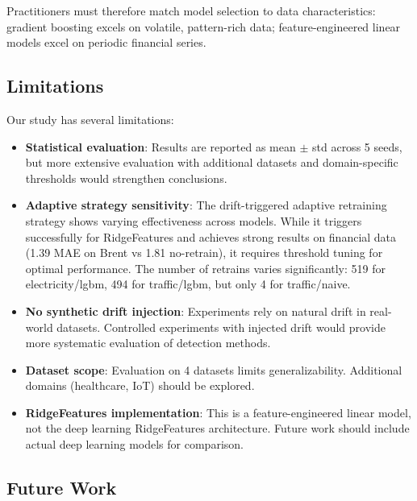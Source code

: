 \documentclass[conference]{IEEEtran}
\begin{document}
Practitioners must therefore match model selection to data
characteristics: gradient boosting excels on volatile, pattern-rich
data; feature-engineered linear models excel on periodic financial
series.

\subsection{Limitations}

Our study has several limitations:

\begin{itemize}
	\item \textbf{Statistical evaluation}: Results are reported as mean $\pm$ std across 5 seeds, but more extensive evaluation with additional datasets and domain-specific thresholds would strengthen conclusions.

	\item \textbf{Adaptive strategy sensitivity}: The drift-triggered adaptive
	      retraining strategy shows varying effectiveness across models.
	      While it triggers successfully for RidgeFeatures and achieves strong
	      results on financial data (1.39 MAE on Brent vs 1.81 no-retrain),
	      it requires threshold tuning for optimal performance. The number
	      of retrains varies significantly: 519 for electricity/lgbm, 494 for
	      traffic/lgbm, but only 4 for traffic/naive.

	\item \textbf{No synthetic drift injection}: Experiments rely on
	      natural drift in real-world datasets. Controlled experiments
	      with injected drift would provide more systematic evaluation of
	      detection methods.

	\item \textbf{Dataset scope}: Evaluation on 4 datasets limits
	      generalizability. Additional domains (healthcare, IoT) should
	      be explored.

	\item \textbf{RidgeFeatures implementation}: This is a feature-engineered
	      linear model, not the deep learning RidgeFeatures architecture.
	      Future work should include actual deep learning models for
	      comparison.
\end{itemize}

\subsection{Future Work}
\end{document}
